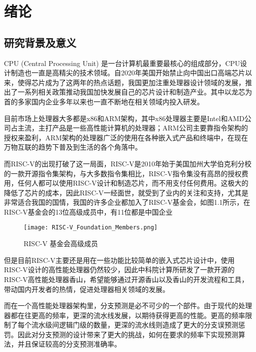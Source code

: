 
\chapter{绪论}

\section{研究背景及意义}
CPU (Central Processing Unit) 是一台计算机最重要最核心的组成部分，CPU设计制造也一直是高精尖的技术领域。自2020年美国开始禁止向中国出口高端芯片以来，使得芯片成为了这两年的热点话题，我国更加注重处理器设计领域的发展，推出了一系列相关政策推动我国加快发展自己的芯片设计和制造产业。其中以龙芯为首的多家国内企业多年以来也一直不断地在相关领域内投入研发。

目前市场上处理器大多都是x86和ARM架构，其中x86处理器主要是Intel和AMD公司占主流，主打产品是一些高性能计算机的处理器；ARM公司主要靠指令架构的授权来盈利，ARM架构的处理器广泛的使用在各种嵌入式产品和终端中，在现在万物互联的趋势下普及到生活的各个角落中。

而RISC-V的出现打破了这一局面，RISC-V是2010年始于美国加州大学伯克利分校的一款开源指令集架构，与大多数指令集相比，RISC-V指令集没有高昂的授权费用，任何人都可以使用RISC-V设计和制造芯片，而不用支付任何费用。这极大的降低了芯片的成本，因此RISC-V一经面世，就受到了业内的关注和支持，尤其是非常适合我国的国情，我国的许多企业都加入了RISC-V基金会，如图1.1所示，在RISC-V基金会的13位高级成员中，有11位都是中国企业

\begin{figure}[htb]
	\centering
	\setlength\tabcolsep{3pt}  %
	\vspace{5pt} %
	\texttt{[image: RISC-V\_Foundation\_Members.png]}
	\caption{RISC-V 基金会高级成员}
	\label{fig:figure1}
\end{figure}

但是目前RISC-V主要还是用在一些功能比较简单的嵌入式芯片设计中，使用RISC-V设计的高性能处理器仍然较少，因此中科院计算所研发了一款开源的RISC-V高性能处理器香山，希望能够通过开源香山以及香山的开发流程和工具，带动国内开发者的热情，促进处理器相关领域的发展。

而在一个高性能处理器架构里，分支预测是必不可少的一个部件。由于现代的处理器都在往更高的频率，更深的流水线发展，以期待获得更高的性能。更高的频率限制了每个流水级间逻辑门级的数量，更深的流水线则造成了更大的分支误预测惩罚。因此对分支预测的设计带来了更大的挑战，如何在要求的频率下实现预测算法，并且保证较高的分支预测准确率。

